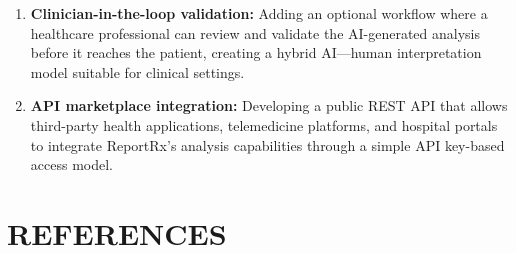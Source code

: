 \documentclass[12pt,a4paper]{report}
\begin{document}
\begin{enumerate}
    \item \textbf{Clinician-in-the-loop validation:} Adding an optional workflow where a healthcare professional can review and validate the AI-generated analysis before it reaches the patient, creating a hybrid AI---human interpretation model suitable for clinical settings.
    \item \textbf{API marketplace integration:} Developing a public REST API that allows third-party health applications, telemedicine platforms, and hospital portals to integrate ReportRx's analysis capabilities through a simple API key-based access model.
\end{enumerate}

\clearpage
{}
\chapter*{REFERENCES}
\end{document}
